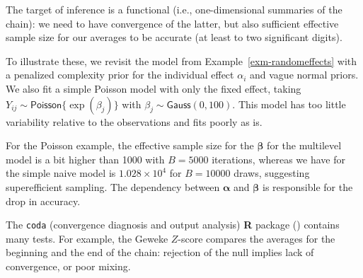 \documentclass[
  11pt,
  letterpaper,
]{scrbook}
\theoremstyle{definition}
\theoremstyle{plain}
\theoremstyle{plain}
\theoremstyle{plain}
\theoremstyle{definition}
\theoremstyle{definition}
\theoremstyle{plain}
\theoremstyle{plain}
\theoremstyle{remark}
\begin{document}
The target of inference is a functional (i.e., one-dimensional summaries
of the chain): we need to have convergence of the latter, but also
sufficient effective sample size for our averages to be accurate (at
least to two significant digits).

To illustrate these, we revisit the model from
Example~\ref{exm-randomeffects} with a penalized complexity prior for
the individual effect \(\alpha_i\) and vague normal priors. We also fit
a simple Poisson model with only the fixed effect, taking
\(Y_{ij} \sim \mathsf{Poisson}\{\exp(\beta_j)\}\) with
\(\beta_j \sim \mathsf{Gauss}(0,100)\). This model has too little
variability relative to the observations and fits poorly as is.

For the Poisson example, the effective sample size for the
\(\boldsymbol{\beta}\) for the multilevel model is a bit higher than
1000 with \(B=5000\) iterations, whereas we have for the simple naive
model is \(\ensuremath{1.028\times 10^{4}}\) for \(B=10000\) draws,
suggesting superefficient sampling. The dependency between
\(\boldsymbol{\alpha}\) and \(\boldsymbol{\beta}\) is responsible for
the drop in accuracy.

The \texttt{coda} (convergence diagnosis and output analysis) \textbf{R}
package () contains many tests.
For example, the Geweke \(Z\)-score compares the averages for the
beginning and the end of the chain: rejection of the null implies lack
of convergence, or poor mixing.
\end{document}
